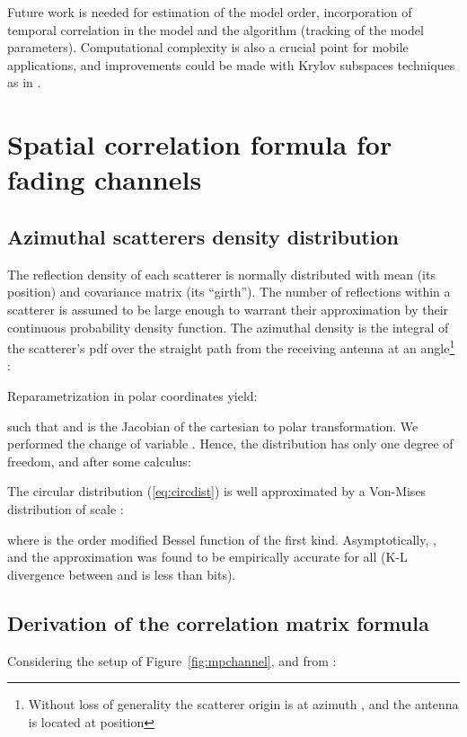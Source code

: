 \documentclass[journal,10pt]{IEEEtran}
\begin{document}
Future work is needed for estimation of the model order, incorporation of temporal correlation in the model and the algorithm (tracking of the model parameters). Computational complexity is also a crucial point for mobile applications, and improvements could be made with Krylov subspaces techniques as in \cite{Barbotin2009}.









\appendices

\section{Spatial correlation formula for fading channels}\label{sec:appendixB}

\subsection{Azimuthal scatterers density distribution}
The reflection density of each scatterer is normally distributed with mean  (its position) and covariance matrix  (its ``girth''). The number of reflections within a scatterer is assumed to be large enough to warrant their approximation by their continuous probability density function. The azimuthal  density is the integral of the scatterer's pdf over  the straight path from the receiving antenna at an angle\footnote{Without loss of generality the scatterer origin is at azimuth , and the antenna is located at position } :

Reparametrization in polar coordinates yield:

such that  and  is the Jacobian of the cartesian to polar transformation. We performed the change of variable .
Hence, the distribution has only one degree of freedom, and after some calculus:

The circular distribution (\ref{eq:circdist}) is well approximated by a Von-Mises distribution of scale :

where  is the  order modified Bessel function of the first kind. Asymptotically, , and the approximation  was found to be empirically accurate for all  (K-L divergence between  and  is less than  bits). 
\subsection{Derivation of the correlation matrix formula}
Considering the setup of Figure~\ref{fig:mpchannel}, and from \cite{Salz1994}:
\end{document}
